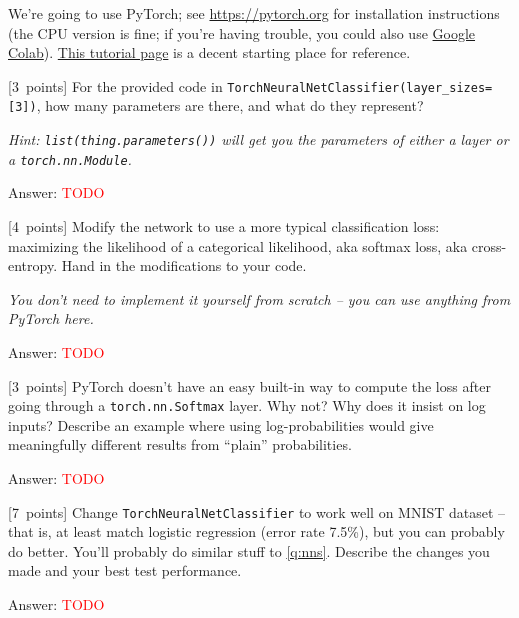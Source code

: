 \documentclass{article}
\newcommand{\ask}[1]{\textcolor{question}{#1}}
\newenvironment{answer}{\par\begingroup\color{answer}Answer: }{\endgroup}
\newcommand{\red}[1]{\textcolor{red}{#1}}
\newcommand{\pts}[1]{\textcolor{points}{[#1~points]}}
\newcommand{\hint}[1]{\textcolor{black!60!white}{\emph{Hint: #1}}}
\newcommand{\meta}[1]{\textcolor{black!60!white}{\emph{#1}}}
\newcommand{\TODO}{\red{TODO}}
\begin{document}
We're going to use PyTorch; see \url{https://pytorch.org} for installation instructions (the CPU version is fine; if you're having trouble, you could also use \href{https://colab.research.google.com/}{Google Colab}). \href{https://pytorch.org/tutorials/beginner/basics/tensorqs_tutorial.html}{This tutorial page} is a decent starting place for reference.

\begin{qlist}[resume]

\item \pts{3}
    For the provided code in \texttt{TorchNeuralNetClassifier(layer\_sizes=[3])}, \ask{how many parameters are there, and what do they represent?}

\hint{\texttt{list(thing.parameters())} will get you the parameters of either a layer or a \texttt{torch.nn.Module}.}

\begin{answer}\TODO\end{answer}

\item \pts{4} Modify the network to use a more typical classification loss: maximizing the likelihood of a categorical likelihood, aka softmax loss, aka cross-entropy. \ask{Hand in the modifications to your code.}

\meta{You don't need to implement it yourself from scratch -- you can use anything from PyTorch here.}

\begin{answer}\TODO\end{answer}


\item \pts{3} PyTorch doesn't have an easy built-in way to compute the loss after going through a \texttt{torch.nn.Softmax} layer. \ask{Why not? Why does it insist on log inputs? Describe an example where using log-probabilities would give meaningfully different results from ``plain'' probabilities.}

\begin{answer}\TODO\end{answer}

\item \pts{7} Change \texttt{TorchNeuralNetClassifier} to work well on MNIST dataset -- that is, at least match logistic regression (error rate 7.5\%), but you can probably do better. You'll probably do similar stuff to \cref{q:nns}. \ask{Describe the changes you made and your best test performance.}

\begin{answer}\TODO\end{answer}


\end{qlist}
\end{document}
